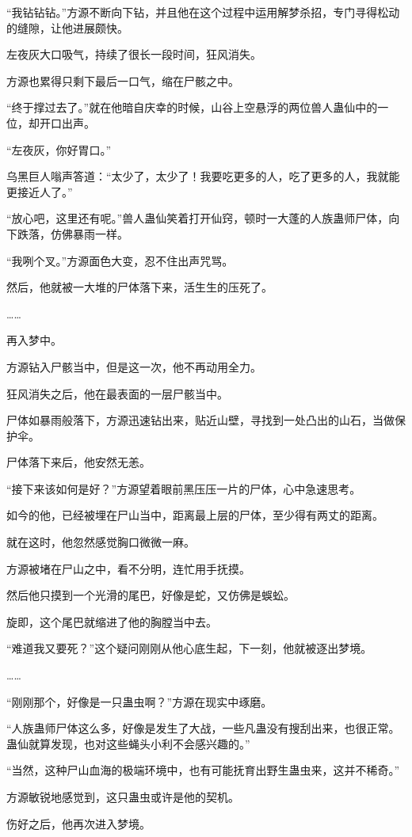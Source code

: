 \begin{this_body}
“我钻钻钻。”方源不断向下钻，并且他在这个过程中运用解梦杀招，专门寻得松动的缝隙，让他进展颇快。

左夜灰大口吸气，持续了很长一段时间，狂风消失。

方源也累得只剩下最后一口气，缩在尸骸之中。

“终于撑过去了。”就在他暗自庆幸的时候，山谷上空悬浮的两位兽人蛊仙中的一位，却开口出声。

“左夜灰，你好胃口。”

乌黑巨人嗡声答道：“太少了，太少了！我要吃更多的人，吃了更多的人，我就能更接近人了。”

“放心吧，这里还有呢。”兽人蛊仙笑着打开仙窍，顿时一大蓬的人族蛊师尸体，向下跌落，仿佛暴雨一样。

“我咧个叉。”方源面色大变，忍不住出声咒骂。

然后，他就被一大堆的尸体落下来，活生生的压死了。

……

再入梦中。

方源钻入尸骸当中，但是这一次，他不再动用全力。

狂风消失之后，他在最表面的一层尸骸当中。

尸体如暴雨般落下，方源迅速钻出来，贴近山壁，寻找到一处凸出的山石，当做保护伞。

尸体落下来后，他安然无恙。

“接下来该如何是好？”方源望着眼前黑压压一片的尸体，心中急速思考。

如今的他，已经被埋在尸山当中，距离最上层的尸体，至少得有两丈的距离。

就在这时，他忽然感觉胸口微微一麻。

方源被堵在尸山之中，看不分明，连忙用手抚摸。

然后他只摸到一个光滑的尾巴，好像是蛇，又仿佛是蜈蚣。

旋即，这个尾巴就缩进了他的胸膛当中去。

“难道我又要死？”这个疑问刚刚从他心底生起，下一刻，他就被逐出梦境。

……

“刚刚那个，好像是一只蛊虫啊？”方源在现实中琢磨。

“人族蛊师尸体这么多，好像是发生了大战，一些凡蛊没有搜刮出来，也很正常。蛊仙就算发现，也对这些蝇头小利不会感兴趣的。”

“当然，这种尸山血海的极端环境中，也有可能抚育出野生蛊虫来，这并不稀奇。”

方源敏锐地感觉到，这只蛊虫或许是他的契机。

伤好之后，他再次进入梦境。


\end{this_body}
